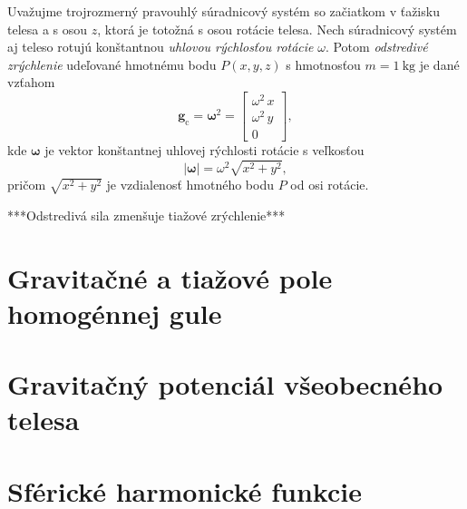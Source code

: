 \documentclass[a4paper, 12pt]{book}
\newcommand{\cidx}{\mathrm c}
\let\vec\mathbf
\begin{document}
Uvažujme trojrozmerný pravouhlý súradnicový systém so začiatkom v ťažisku 
telesa a s osou $z$, ktorá je totožná s osou rotácie telesa.  Nech súradnicový 
systém aj teleso rotujú konštantnou \emph{uhlovou rýchlosťou rotácie} $\omega$.  
Potom \emph{odstredivé zrýchlenie} udeľované hmotnému bodu $P(x, y, z)$ 
s hmotnosťou $m = 1\ \mathrm{kg}$ je dané vzťahom
%
\begin{equation}
\label{eq:fc}
\vec g_\cidx = \boldsymbol{\omega}^2 = 
%
\begin{bmatrix}
\omega^2 \, x\\
\omega^2 \, y\\
0
\end{bmatrix}
{,}
\end{equation}
%
kde $\boldsymbol{\omega}$ je vektor konštantnej uhlovej rýchlosti rotácie 
s veľkosťou
%
\begin{equation}
| \boldsymbol{\omega} | = \omega^2 \sqrt{x^2 + y^2}{,}
\end{equation}
%
pričom $\sqrt{x^2 + y^2}$ je vzdialenosť hmotného bodu $P$ od osi 
rotácie.

***Odstredivá sila zmenšuje tiažové zrýchlenie***


\chapter{Gravitačné a tiažové pole homogénnej gule}







\chapter{Gravitačný potenciál všeobecného telesa}








\chapter{Sférické harmonické funkcie}
\end{document}
